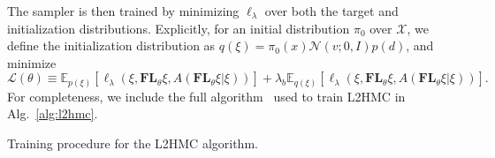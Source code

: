 The sampler is then trained by minimizing $\ell_{\lambda}$ over both the target
and initialization distributions.
%
Explicitly, for an initial distribution $\pi_0$ over $\mathcal{X}$, we define
the initialization distribution as $q(\xi) = \pi_0(x) \mathcal{N}(v; 0, I)
p(d)$, and minimize
%
\begin{equation}
    \mathcal{L}(\theta)\equiv \mathbb{E}_{p(\xi)}\left[\ell_{\lambda}(\xi,
    \mathbf{FL}_{\theta}\xi, A(\mathbf{FL}_{\theta}\xi|\xi))\right] + \lambda_b
    \mathbb{E}_{q(\xi)}\left[\ell_{\lambda}(\xi, \mathbf{FL}_{\theta}\xi,
    A(\mathbf{FL}_{\theta} \xi| \xi))\right].
    \label{eq:loss_L}
\end{equation}
%
For completeness, we include the full algorithm~\cite{2017arXiv171109268L} used
to train L2HMC in Alg.~\ref{alg:l2hmc}.
%
\begin{algorithm}[htbp]%
    \AlgoDontDisplayBlockMarkers\SetAlgoNoEnd%
    \DontPrintSemicolon%
    \caption{Training procedure for the L2HMC algorithm.}%
\end{algorithm}
